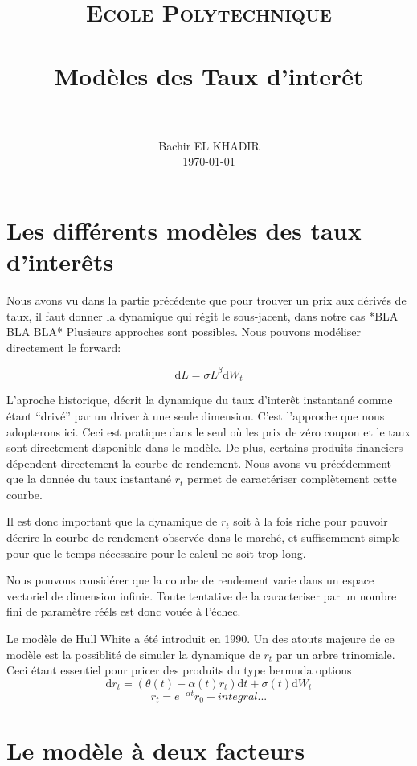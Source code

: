 \documentclass[paper=a4, fontsize=11pt]{scrartcl}
\title{
		\usefont{OT1}{bch}{b}{n}
		\normalfont \normalsize \textsc{Ecole Polytechnique} \\ [25pt]
		\horrule{0.5pt} \\[0.4cm]
		\huge Modèles des Taux d'interêt \\
		\horrule{2pt} \\[0.5cm]
}
\author{
		\normalfont \normalsize
                Bachir EL KHADIR\\[-3pt] \normalsize
                \today	
}
\date{}
\numberwithin{equation}{section}		%
\numberwithin{figure}{section}			%
\numberwithin{table}{section}				%
\theoremstyle{definition}
\begin{document}
\maketitle

\newpage
\tableofcontents

\newpage

\newpage
 
\newpage
 
\newpage
\section{Les différents modèles des taux d'interêts}

Nous avons vu dans la partie précédente que pour trouver un prix aux dérivés de taux, il faut donner la dynamique qui régit le sous-jacent, dans notre cas  *BLA BLA BLA*
Plusieurs approches sont possibles. Nous pouvons modéliser directement le forward:

$$\mathrm{d} L = \sigma L^\beta \mathrm{d}W_t$$

L'aproche historique, décrit la dynamique du taux d'interêt instantané comme étant ``drivé'' par un driver à une seule dimension. C'est l'approche que nous adopterons ici.
Ceci est pratique dans le seul où les prix de zéro coupon et le taux sont directement disponible dans le modèle.
De plus, certains produits financiers dépendent directement la courbe de rendement.
Nous avons vu précédemment que la donnée du taux instantané $r_t$ permet de caractériser complètement cette courbe. 

Il est donc important que la dynamique de $r_t$ soit à la fois riche pour pouvoir décrire la courbe de rendement observée dans le marché, et suffisemment simple pour que le temps nécessaire pour le calcul ne soit trop long.

Nous pouvons considérer que la courbe de rendement varie dans un espace vectoriel de dimension infinie. Toute tentative de la caracteriser par un nombre fini de paramètre rééls est donc vouée à l'échec.

Le modèle de Hull White a été introduit en 1990.  Un des atouts majeure de ce modèle est la possiblité de simuler la dynamique de $r_t$ par un arbre trinomiale. Ceci étant essentiel pour pricer des produits du type bermuda options
$$ \mathrm{d}r_t =  (\theta(t) - \alpha(t) r_t) \mathrm{d}t + \sigma(t) \mathrm{d} W_t$$
$$ r_t = e^{-\alpha t} r_0 + integral ...$$


\newpage
\section{Le modèle à deux facteurs}
\end{document}
